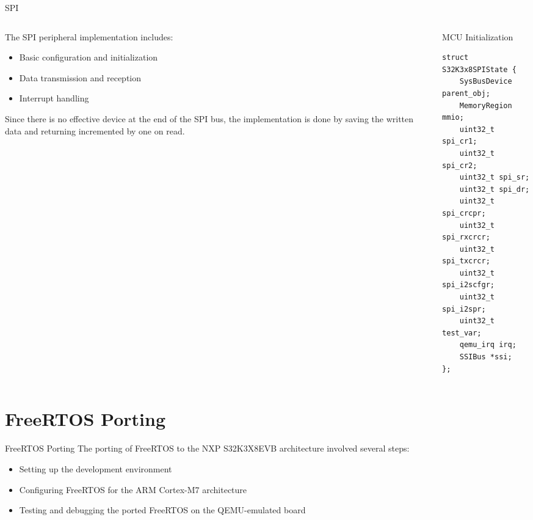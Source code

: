\documentclass{beamer}
\begin{document}
\footlinecolor{}
\begin{frame}[fragile]{SPI}
    \begin{columns}
        \begin{column}{0.5\textwidth}
            The SPI peripheral implementation includes:
            \begin{itemize}
                \item Basic configuration and initialization
                \item Data transmission and reception
                \item Interrupt handling
            \end{itemize}
            Since there is no effective device at the end of the SPI bus, the implementation is done by saving the written data and returning incremented by one on read.
        \end{column}
        \begin{column}{0.5\textwidth}
            \begin{block}{MCU Initialization}
                    \begin{footnotesize}
                        \begin{verbatim}
struct S32K3x8SPIState {
    SysBusDevice parent_obj;
    MemoryRegion mmio;
    uint32_t spi_cr1;
    uint32_t spi_cr2;
    uint32_t spi_sr;
    uint32_t spi_dr;
    uint32_t spi_crcpr;
    uint32_t spi_rxcrcr;
    uint32_t spi_txcrcr;
    uint32_t spi_i2scfgr;
    uint32_t spi_i2spr;
    uint32_t test_var;
    qemu_irq irq;
    SSIBus *ssi;
};
                        \end{verbatim}
                    \end{footnotesize}
            \end{block}
        \end{column}
    \end{columns}
\end{frame}



\section{FreeRTOS Porting}

\footlinecolor{}
\begin{frame}[fragile]{FreeRTOS Porting}
    The porting of FreeRTOS to the NXP S32K3X8EVB architecture involved several steps:
    \begin{itemize}
        \item Setting up the development environment
        \item Configuring FreeRTOS for the ARM Cortex-M7 architecture
        \item Testing and debugging the ported FreeRTOS on the QEMU-emulated board
    \end{itemize}
\end{frame}
\end{document}
